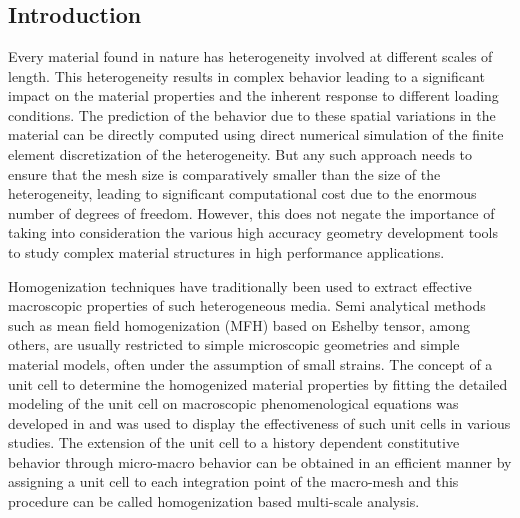 
\chapter{\titlech}\label{chap-ch}

\section{Introduction}
Every material found in nature has heterogeneity involved at different scales of length. This heterogeneity results in complex behavior leading to a significant impact on the material properties and the inherent response to different loading conditions. The prediction of the behavior due to these spatial variations in the material can be directly computed using direct numerical simulation of the finite element discretization of the heterogeneity. But any such approach needs to ensure that the mesh size is comparatively smaller than the size of the heterogeneity, leading to significant computational cost due to the enormous number of degrees of freedom. However, this does not negate the importance of taking into consideration the various high accuracy geometry development tools to study complex material structures in high performance applications.

Homogenization techniques have traditionally been used to extract effective macroscopic properties of such heterogeneous media. Semi analytical methods such as mean field homogenization (MFH) based on Eshelby tensor\cite{pierardMeanfieldHomogenizationMultiphase2004}, 
among others, are usually restricted to simple microscopic geometries and simple material models, often under the assumption of small strains. The concept of a unit cell to determine the homogenized material properties by fitting the detailed modeling of the unit cell on macroscopic phenomenological equations was developed in \cite{hillElasticPropertiesReinforced1963} and was used to display the effectiveness of such unit cells in various studies\cite{christmanExperimentalNumericalStudy1989,tvergaardMechanicalModellingDuctile1991,baoImprovedTn7basedSystem1991,brockenbroughDeformationMetalmatrixComposites1991}. The extension of the unit cell to a history dependent constitutive behavior through micro-macro behavior can be obtained in an efficient manner by assigning a unit cell to each integration point of the macro-mesh\cite{smitPredictionMechanicalBehavior1998} and this procedure can be called homogenization based multi-scale analysis.

